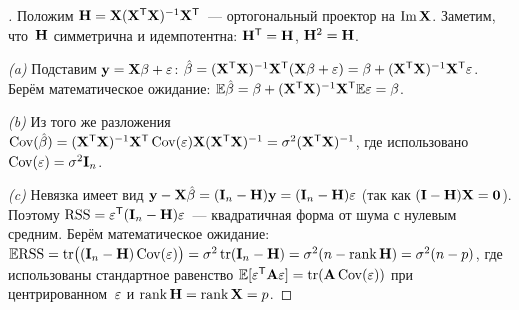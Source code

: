 \begin{proof}[]
Положим $\mathbf{H} = \mathbf{X} (\mathbf{X}^{\mathsf{T}} \mathbf{X})^{-1} \mathbf{X}^{\mathsf{T}}$~--- ортогональный проектор на $\operatorname{Im} \mathbf{X}$. Заметим, что~$\mathbf{H}$ симметрична и идемпотентна: $\mathbf{H}^{\mathsf{T}} = \mathbf{H}$, $\mathbf{H}^2 = \mathbf{H}$.

\emph{(a)} Подставим $\mathbf{y} = \mathbf{X} \mathbf{\beta} + \mathbf{\varepsilon}$: $\hat{\mathbf{\beta}} = (\mathbf{X}^{\mathsf{T}} \mathbf{X})^{-1} \mathbf{X}^{\mathsf{T}} (\mathbf{X} \mathbf{\beta} + \mathbf{\varepsilon}) = \mathbf{\beta} + (\mathbf{X}^{\mathsf{T}} \mathbf{X})^{-1} \mathbf{X}^{\mathsf{T}} \mathbf{\varepsilon}$. Берём математическое ожидание: $\mathbb{E} \hat{\mathbf{\beta}} = \mathbf{\beta} + (\mathbf{X}^{\mathsf{T}} \mathbf{X})^{-1} \mathbf{X}^{\mathsf{T}} \mathbb{E} \mathbf{\varepsilon} = \mathbf{\beta}$.

\emph{(b)} Из того же разложения $\operatorname{Cov}(\hat{\mathbf{\beta}}) = (\mathbf{X}^{\mathsf{T}} \mathbf{X})^{-1} \mathbf{X}^{\mathsf{T}} \operatorname{Cov}(\mathbf{\varepsilon}) \mathbf{X} (\mathbf{X}^{\mathsf{T}} \mathbf{X})^{-1} = \sigma^2 (\mathbf{X}^{\mathsf{T}} \mathbf{X})^{-1}$, где использовано $\operatorname{Cov}(\mathbf{\varepsilon}) = \sigma^2 \mathbf{I}_n$.

\emph{(c)} Невязка имеет вид $\mathbf{y} - \mathbf{X} \hat{\mathbf{\beta}} = (\mathbf{I}_n - \mathbf{H}) \mathbf{y} = (\mathbf{I}_n - \mathbf{H}) \mathbf{\varepsilon}$ (так как $(\mathbf{I} - \mathbf{H}) \mathbf{X} = \mathbf{0}$). Поэтому $\mathrm{RSS} = \mathbf{\varepsilon}^{\mathsf{T}} (\mathbf{I}_n - \mathbf{H}) \mathbf{\varepsilon}$~--- квадратичная форма от шума с нулевым средним. Берём математическое ожидание: $\mathbb{E} \mathrm{RSS} = \operatorname{tr}\bigl((\mathbf{I}_n - \mathbf{H}) \operatorname{Cov}(\mathbf{\varepsilon})\bigr) = \sigma^2 \operatorname{tr}(\mathbf{I}_n - \mathbf{H}) = \sigma^2 (n - \operatorname{rank} \mathbf{H}) = \sigma^2 (n - p)$, где использованы стандартное равенство $\mathbb{E}[\mathbf{\varepsilon}^{\mathsf{T}} \mathbf{A} \mathbf{\varepsilon}] = \operatorname{tr}(\mathbf{A} \operatorname{Cov}(\mathbf{\varepsilon}))$ при центрированном~$\mathbf{\varepsilon}$ и $\operatorname{rank} \mathbf{H} = \operatorname{rank} \mathbf{X} = p$.
\end{proof}

